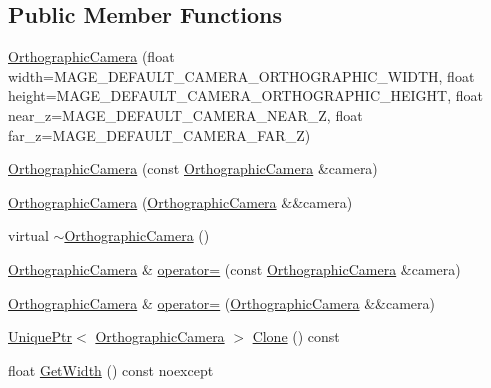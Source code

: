 \subsection*{Public Member Functions}
\begin{DoxyCompactItemize}
\item 
\hyperlink{classmage_1_1_orthographic_camera_a4a9c362b0c1cb90608b699deb3ae8b23}{Orthographic\+Camera} (float width=M\+A\+G\+E\+\_\+\+D\+E\+F\+A\+U\+L\+T\+\_\+\+C\+A\+M\+E\+R\+A\+\_\+\+O\+R\+T\+H\+O\+G\+R\+A\+P\+H\+I\+C\+\_\+\+W\+I\+D\+TH, float height=M\+A\+G\+E\+\_\+\+D\+E\+F\+A\+U\+L\+T\+\_\+\+C\+A\+M\+E\+R\+A\+\_\+\+O\+R\+T\+H\+O\+G\+R\+A\+P\+H\+I\+C\+\_\+\+H\+E\+I\+G\+HT, float near\+\_\+z=M\+A\+G\+E\+\_\+\+D\+E\+F\+A\+U\+L\+T\+\_\+\+C\+A\+M\+E\+R\+A\+\_\+\+N\+E\+A\+R\+\_\+Z, float far\+\_\+z=M\+A\+G\+E\+\_\+\+D\+E\+F\+A\+U\+L\+T\+\_\+\+C\+A\+M\+E\+R\+A\+\_\+\+F\+A\+R\+\_\+Z)
\item 
\hyperlink{classmage_1_1_orthographic_camera_aad12a2901577a187bb53e4c2e2f5a658}{Orthographic\+Camera} (const \hyperlink{classmage_1_1_orthographic_camera}{Orthographic\+Camera} \&camera)
\item 
\hyperlink{classmage_1_1_orthographic_camera_ac7b6bd4cb086403e130e5deaaa16046d}{Orthographic\+Camera} (\hyperlink{classmage_1_1_orthographic_camera}{Orthographic\+Camera} \&\&camera)
\item 
virtual \hyperlink{classmage_1_1_orthographic_camera_ac7d1f4ce12a5d0a2539b610f14f59304}{$\sim$\+Orthographic\+Camera} ()
\item 
\hyperlink{classmage_1_1_orthographic_camera}{Orthographic\+Camera} \& \hyperlink{classmage_1_1_orthographic_camera_ac4a319517ed3b9708028e555660b23aa}{operator=} (const \hyperlink{classmage_1_1_orthographic_camera}{Orthographic\+Camera} \&camera)
\item 
\hyperlink{classmage_1_1_orthographic_camera}{Orthographic\+Camera} \& \hyperlink{classmage_1_1_orthographic_camera_a7fc303921e07ae18dd6fb7e9b7812847}{operator=} (\hyperlink{classmage_1_1_orthographic_camera}{Orthographic\+Camera} \&\&camera)
\item 
\hyperlink{namespacemage_a8c307fbcc33bce9b7f2aa4c26c3b95cf}{Unique\+Ptr}$<$ \hyperlink{classmage_1_1_orthographic_camera}{Orthographic\+Camera} $>$ \hyperlink{classmage_1_1_orthographic_camera_a873f0a715743a7dc104935995696dd33}{Clone} () const
\item 
float \hyperlink{classmage_1_1_orthographic_camera_ab3c2878e9c06b38b442eb7b1fa00ec78}{Get\+Width} () const noexcept
\item 

\end{DoxyCompactItemize}
